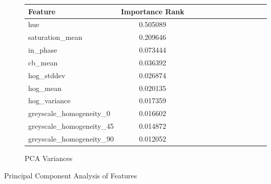 \documentclass[12pt]{article}
\begin{document}
\begin{figure}[h]
\begin{subfigure}[h]{.32\textwidth}
{		\begin{longtable}[c]{
		    |l |*{12}{c |} }%
		    \hline
		    {\textbf{Feature}} & {\textbf{Importance Rank}}\\
		    \hline
			hue                      &     0.505089 \\
			saturation\_mean          &     0.209646 \\
			in\_phase                 &     0.073444 \\
			cb\_mean                  &     0.036392 \\
			hog\_stddev               &     0.026874 \\
			hog\_mean                 &     0.020135 \\
			hog\_variance             &     0.017359 \\
			greyscale\_homogeneity\_0  &     0.016602 \\
			greyscale\_homogeneity\_45 &     0.014872 \\
			greyscale\_homogeneity\_90 &     0.012052 \\	    
		    
		    \hline
		  \end{longtable}
		 }
	  \caption{PCA Variances}
	\end{subfigure}
\caption{Principal Component Analysis of Features}
\label{fig:pca}
\end{figure}
\end{document}

